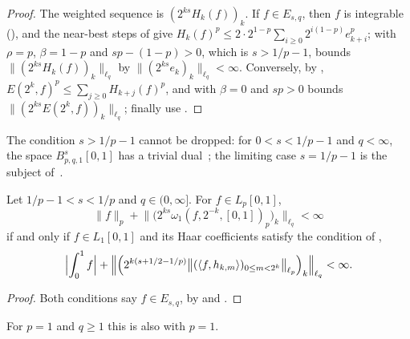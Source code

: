 \begin{proof}
\leanok
The weighted sequence is $(2^{ks} H_k(f))_k$. If $f \in E_{s,q}$, then $f$ is integrable
(), and the near-best steps of  give
$H_k(f)^p \leq 2 \cdot 2^{1-p} \sum_{i \geq 0} 2^{i(1-p)} e_{k+i}^p$; 
with $\rho = p$, $\beta = 1 - p$ and $s p - (1 - p) > 0$, which is $s > 1/p - 1$, bounds
$\|(2^{ks} H_k(f))_k\|_{\ell_q}$ by $\|(2^{ks} e_k)_k\|_{\ell_q} < \infty$. Conversely, by
, $E(2^k, f)^p \leq \sum_{j \geq 0} H_{k+j}(f)^p$, and
 with $\beta = 0$ and $s p > 0$ bounds
$\|(2^{ks} E(2^k, f))_k\|_{\ell_q}$; finally use .
\end{proof}

The condition $s > 1/p - 1$ cannot be dropped: for $0 < s < 1/p - 1$ and $q < \infty$, the space
$B^s_{p,q,1}[0, 1]$ has a trivial dual~\cite[\S1 and Theorem~1~(i)]{Oswald2018}; the limiting case
$s = 1/p - 1$ is the subject of~\cite{Oswald2018}.

\begin{corollary}
\label{cor:haar-besov-below-one}
\leanok
{}
Let $1/p - 1 < s < 1/p$ and $q \in (0, \infty]$. For $f \in L_p[0, 1]$,
\[
  \|f\|_p + \bigl\| \bigl( 2^{ks} \omega_1(f, 2^{-k}, [0,1])_p \bigr)_k \bigr\|_{\ell_q} < \infty
\]
if and only if $f \in L_1[0, 1]$ and its Haar coefficients satisfy the condition of
,
\[
  \Bigl| \int_0^1 f \Bigr| + \Bigl\| \Bigl(2^{k(s + 1/2 - 1/p)}
  \bigl\| (\langle f, h_{k,m} \rangle)_{0 \leq m < 2^k} \bigr\|_{\ell_p} \Bigr)_k
  \Bigr\|_{\ell_q} < \infty .
\]
\end{corollary}

\begin{proof}
\leanok
Both conditions say $f \in E_{s,q}$, by  and
.
\end{proof}

For $p = 1$ and $q \geq 1$ this is also  with $p = 1$.

